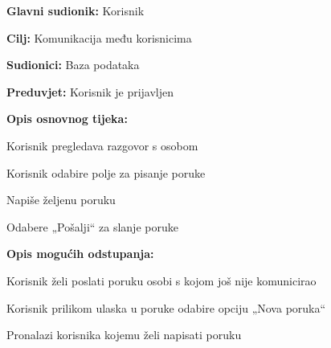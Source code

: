 				\noindent {}
			\begin{packed_item}
				
				\item \textbf{Glavni sudionik: }Korisnik
				\item  \textbf{Cilj:} Komunikacija među korisnicima
				\item  \textbf{Sudionici:} Baza podataka
				\item  \textbf{Preduvjet:} Korisnik je prijavljen
				\item  \textbf{Opis osnovnog tijeka:}
				
				\item[] \begin{packed_enum}
					
					\item Korisnik pregledava razgovor s osobom
					\item Korisnik odabire polje za pisanje poruke
					\item Napiše željenu poruku
					\item Odabere „Pošalji“ za slanje poruke
				\end{packed_enum}
				
				\item  \textbf{Opis mogućih odstupanja:}
				
				\item[] \begin{packed_item}
					
					\item[1.a] Korisnik želi poslati poruku osobi s kojom još nije komunicirao
					\item[] \begin{packed_enum}
						\item Korisnik prilikom ulaska u poruke odabire opciju „Nova poruka“
						\item Pronalazi korisnika kojemu želi napisati poruku
					\end{packed_enum}
				\end{packed_item}
			\end{packed_item}
			
